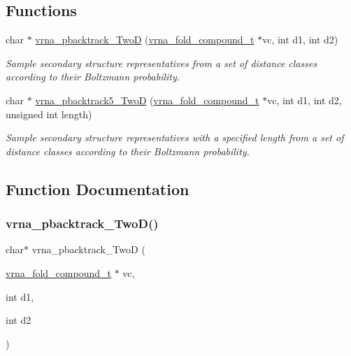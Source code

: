 \subsection*{Functions}
\begin{DoxyCompactItemize}
\item 
char $\ast$ \hyperlink{group__kl__neighborhood__stochbt_ga14aceef73f83bbde77bb3a0ca06c9d13}{vrna\+\_\+pbacktrack\+\_\+\+TwoD} (\hyperlink{group__fold__compound_ga1b0cef17fd40466cef5968eaeeff6166}{vrna\+\_\+fold\+\_\+compound\+\_\+t} $\ast$vc, int d1, int d2)
\begin{DoxyCompactList}\small\item\em Sample secondary structure representatives from a set of distance classes according to their Boltzmann probability. \end{DoxyCompactList}\item 
char $\ast$ \hyperlink{group__kl__neighborhood__stochbt_ga6504913303bc325659c365d5f59b41e0}{vrna\+\_\+pbacktrack5\+\_\+\+TwoD} (\hyperlink{group__fold__compound_ga1b0cef17fd40466cef5968eaeeff6166}{vrna\+\_\+fold\+\_\+compound\+\_\+t} $\ast$vc, int d1, int d2, unsigned int length)
\begin{DoxyCompactList}\small\item\em Sample secondary structure representatives with a specified length from a set of distance classes according to their Boltzmann probability. \end{DoxyCompactList}\end{DoxyCompactItemize}


\subsection{Function Documentation}
\mbox{\label{group__kl__neighborhood__stochbt_ga14aceef73f83bbde77bb3a0ca06c9d13}} 
\subsubsection{\texorpdfstring{vrna\+\_\+pbacktrack\+\_\+\+Two\+D()}{vrna\_pbacktrack\_TwoD()}}
{\footnotesize\ttfamily char$\ast$ vrna\+\_\+pbacktrack\+\_\+\+TwoD (\begin{DoxyParamCaption}\item[{\hyperlink{group__fold__compound_ga1b0cef17fd40466cef5968eaeeff6166}{vrna\+\_\+fold\+\_\+compound\+\_\+t} $\ast$}]{vc,  }\item[{int}]{d1,  }\item[{int}]{d2 }\end{DoxyParamCaption})}




